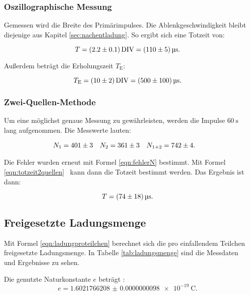 \subsubsection{Oszillographische Messung}

Gemessen wird die Breite des Primärimpulses. Die Ablenkgeschwindigkeit bleibt diejenige aus
Kapitel \ref{sec:nachentladung}.
So ergibt sich eine Totzeit von:

\begin{equation*}
  T = \SI{2.2+-0.1}{\text{DIV}} = \SI{110+-5}{\micro\second}.
\end{equation*}

Außerdem beträgt die Erholungszeit $T_\text{E}$:

\begin{equation*}
  T_\text{E} = \SI{10+-2}{\text{DIV}} = \SI{500+-100}{\micro\second}.
\end{equation*}

\subsubsection{Zwei-Quellen-Methode}

Um eine möglichst genaue Messung zu gewährleisten, werden die Impulse $\SI{60}{\second}$ lang
aufgenommen. Die Messwerte lauten:

\begin{align*}
  N_1 &= \num{401+-3} & N_2 &= \num{361+-3} & N_{1+2} &= \num{742+-4}.
\end{align*}

Die Fehler wurden erneut mit Formel \eqref{eqn:fehlerN} bestimmt. Mit Formel \eqref{eqn:totzeit2quellen}%
~kann dann die Totzeit bestimmt werden. Das Ergebnis ist dann:

\begin{equation*}
  T = \SI{74+-18}{\micro\second}.
\end{equation*}

\subsection{Freigesetzte Ladungsmenge}

Mit Formel \eqref{eqn:ladungproteilchen}%
berechnet sich die pro einfallendem Teilchen freigesetzte Ladungsmenge.
In Tabelle \ref{tab:ladungsmenge} sind die Messdaten und Ergebnisse zu sehen.

Die genutzte Naturkonstante $\si{\elementarycharge}$ beträgt \cite{codata}:
\begin{equation}
  \si{\elementarycharge} =  \SI{1.6021766208(98)e-19}{\coulomb}.
\end{equation}


